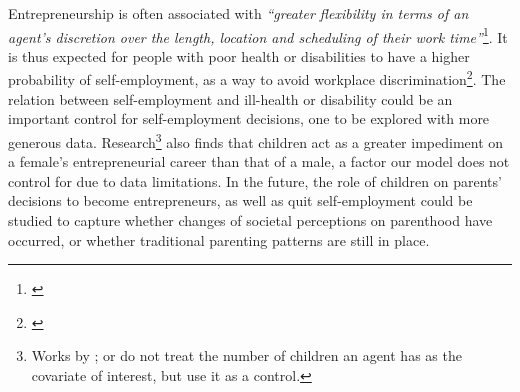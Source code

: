 Entrepreneurship is often associated with \textit{``greater flexibility in terms of an agent's discretion over the length, location and scheduling of their work time''}\footnote{\cite{Quinn1980}}. It is thus expected for people with poor health or disabilities to have a higher probability of self-employment, as a way to avoid workplace discrimination\footnote{\cite{Quinn1980}}. The relation between self-employment and ill-health or disability could be an important control for self-employment decisions, one to be explored with more generous data. Research\footnote{ Works by \cite{BurkeFitzroyNolan2002}; \cite{GeorgellisWall2005} or \cite{CowlingTaylor2001} do not treat the number of children an agent has as the covariate of interest, but use it as a control.} also finds that children act as a greater impediment on a female's entrepreneurial career than that of a male, a factor our model does not control for due to data limitations. In the future, the role of children on parents' decisions to become entrepreneurs, as well as quit self-employment could be studied to capture whether changes of societal perceptions on parenthood have occurred, or whether traditional parenting patterns are still in place.  













